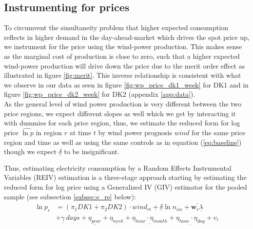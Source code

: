 \subsection{Instrumenting for prices}
\label{subsec:e_instrumenting}
To circumvent the simultaneity problem that higher expected consumption reflects in higher demand in the day-ahead-market which drives the spot price up, we instrument for the price using the wind-power production. This makes sense as the marginal cost of production is close to zero, such that a higher expected wind-power production will drive down the price due to the merit order effect as illustrated in figure \ref{fig:merit}. This inverse relationship is consistent with what we observe in our data as seen in figure \ref{fig:wp_price_dk1_week} for DK1 and in figure \ref{fig:wp_price_dk2_week} for DK2 (appendix \ref{app:data}).
\medskip\\
As the general level of wind power production is very different between the two price regions, we expect different slopes as well which we get by interacting it with dummies for each price region, thus, we estimate the reduced form for log price $\widehat{\ln p}$ in region $r$ at time $t$ by wind power prognosis $wind$ for the same price region and time as well as using the same controls as in equation (\ref{eq:baseline}) though we expect $\underline{\delta}$ to be insignificant.
\par
Thus, estimating electricity consumption by a Random Effects Instrumental Variables (REIV) estimation is a three-stage approach starting by estimating the reduced form for log price using a Generalized IV (GIV) estimator for the pooled sample (see subsection \ref{subsec:e_re} below):
\begin{equation}
  \label{eq:reduced}
  \begin{split}
    \ln p_{r} &= (\pi_1 DK1+\pi_2 DK2)\cdot wind_{rt} +\underline{\delta}\ln n_{im}+\bm{w}^{'}_{r}\underline{\lambda}\\
  &+\underline{\gamma}\ days+\underline{\eta_{year}}+\underline{\eta_{week}}+\underline{\eta_{hour}\cdot\eta_{month}}+\underline{\eta_{hour}\cdot\eta_{day}}+v_{i}
  \end{split}
\end{equation}
\vspace{-1em}
